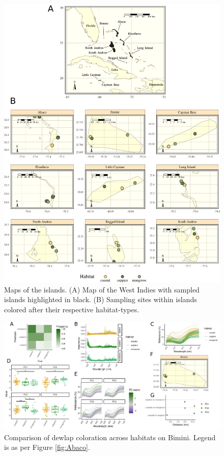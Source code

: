 \begin{figure}[H]
	\centering
	\includegraphics[width=\textwidth]{figures/all_maps.png}
	\caption{Maps of the islands. (A) Map of the West Indies with sampled islands highlighted in black. (B) Sampling sites within islands colored after their respective habitat-types.}
	\label{fig:maps}
\end{figure}

\begin{figure}[H]
	\centering
	\includegraphics[width=\textwidth]{figures/Bimini.png}
	\caption{Comparison of dewlap coloration across habitats on Bimini. Legend is as per Figure \ref{fig:Abaco}.}
	\label{fig:Bimini}
\end{figure}

